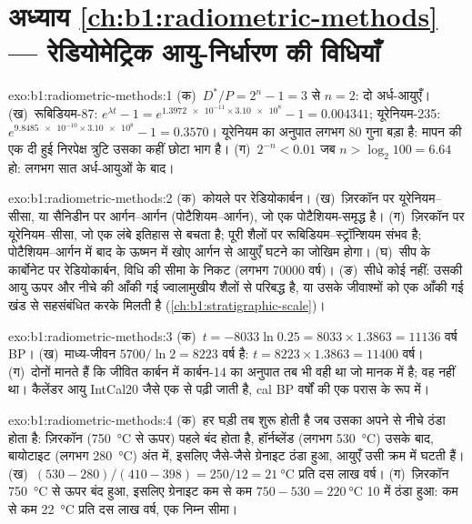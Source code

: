 \section*{अध्याय \ref{ch:b1:radiometric-methods} --- रेडियोमेट्रिक आयु-निर्धारण की विधियाँ}

\begin{solution}{exo:b1:radiometric-methods:1}
(क)~$D^*/P = 2^n - 1 = 3$ से $n = 2$: दो अर्ध-आयुएँ। (ख)~रूबिडियम-87: $e^{\lambda t} - 1 = e^{\num{1.3972e-11} \times \num{3.10e8}} - 1 = 0.004341$; यूरेनियम-235: $e^{\num{9.8485e-10} \times \num{3.10e8}} - 1 = 0.3570$। यूरेनियम का अनुपात लगभग 80 गुना बड़ा है: मापन की एक दी हुई निरपेक्ष त्रुटि उसका कहीं छोटा भाग है। (ग)~$2^{-n} < 0.01$ जब $n > \log_2 100 = 6.64$ हो: लगभग सात अर्ध-आयुओं के बाद।
\end{solution}

\begin{solution}{exo:b1:radiometric-methods:2}
(क)~कोयले पर रेडियोकार्बन। (ख)~ज़िरकॉन पर यूरेनियम–सीसा, या सैनिडीन पर आर्गन–आर्गन (पोटैशियम–आर्गन), जो एक पोटैशियम-समृद्ध  है। (ग)~ज़िरकॉन पर यूरेनियम–सीसा, जो एक लंबे इतिहास से बचता है; पूरी शैलों पर रूबिडियम–स्ट्रॉन्शियम संभव है; पोटैशियम–आर्गन में बाद के ऊष्मन में खोए आर्गन से आयुएँ घटने का जोखिम होगा। (घ)~सीप के कार्बोनेट पर रेडियोकार्बन, विधि की सीमा के निकट (लगभग \num{70000} वर्ष)। (ङ)~सीधे कोई नहीं: उसकी आयु ऊपर और नीचे की आँकी गई ज्वालामुखीय शैलों से परिबद्ध है, या उसके जीवाश्मों को एक आँकी गई खंड से सहसंबंधित करके मिलती है (\cref{ch:b1:stratigraphic-scale})।
\end{solution}

\begin{solution}{exo:b1:radiometric-methods:3}
(क)~$t = -8033 \ln 0.25 = 8033 \times 1.3863 = \num{11136}$ वर्ष BP। (ख)~माध्य-जीवन $5700/\ln 2 = \num{8223}$ वर्ष है: $t = 8223 \times 1.3863 =
\num{11400}$ वर्ष। (ग)~दोनों मानते हैं कि जीवित कार्बन में कार्बन-14 का अनुपात तब भी वही था जो मानक में है; वह नहीं था। कैलेंडर आयु IntCal20 जैसे एक  से पढ़ी जाती है, cal BP वर्षों की एक परास के रूप में।
\end{solution}

\begin{solution}{exo:b1:radiometric-methods:4}
(क)~हर घड़ी तब शुरू होती है जब उसका  अपने  से नीचे ठंडा होता है: ज़िरकॉन (\qty{750}{\celsius} से ऊपर) पहले बंद होता है, हॉर्नब्लेंड (लगभग \qty{530}{\celsius}) उसके बाद, बायोटाइट (लगभग \qty{280}{\celsius}) अंत में, इसलिए जैसे-जैसे ग्रेनाइट ठंडा हुआ, आयुएँ उसी क्रम में घटती हैं। (ख)~$(530 - 280)/(410 - 398) =
250/12 = \qty{21}{\celsius}$ प्रति दस लाख वर्ष। (ग)~ज़िरकॉन \qty{750}{\celsius} से ऊपर बंद हुआ, इसलिए ग्रेनाइट कम से कम $750 - 530 =
\qty{220}{\celsius}$ \qty{10}{\Myr} में ठंडा हुआ: कम से कम \qty{22}{\celsius} प्रति दस लाख वर्ष, एक निम्न सीमा।
\end{solution}

